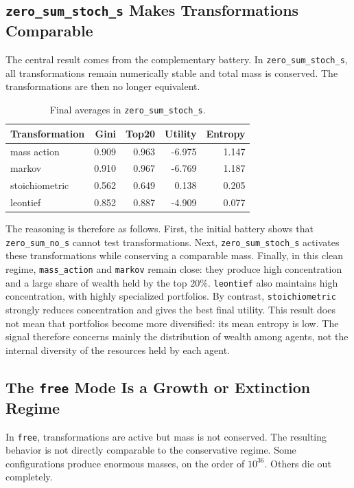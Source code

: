 \documentclass[11pt]{article}
\begin{document}
\subsection{\texttt{zero\_sum\_stoch\_s} Makes Transformations Comparable}

The central result comes from the complementary battery. In \texttt{zero\_sum\_stoch\_s}, all transformations remain numerically stable and total mass is conserved. The transformations are then no longer equivalent.

\begin{table}[H]
\centering
\begin{tabular}{lrrrr}
\toprule
Transformation & Gini & Top20 & Utility & Entropy \\
\midrule
mass action & 0.909 & 0.963 & -6.975 & 1.147 \\
markov & 0.910 & 0.967 & -6.769 & 1.187 \\
stoichiometric & 0.562 & 0.649 & 0.138 & 0.205 \\
leontief & 0.852 & 0.887 & -4.909 & 0.077 \\
\bottomrule
\end{tabular}
\caption{Final averages in \texttt{zero\_sum\_stoch\_s}.}
\end{table}

The reasoning is therefore as follows. First, the initial battery shows that \texttt{zero\_sum\_no\_s} cannot test transformations. Next, \texttt{zero\_sum\_stoch\_s} activates these transformations while conserving a comparable mass. Finally, in this clean regime, \texttt{mass\_action} and \texttt{markov} remain close: they produce high concentration and a large share of wealth held by the top $20\%$. \texttt{leontief} also maintains high concentration, with highly specialized portfolios. By contrast, \texttt{stoichiometric} strongly reduces concentration and gives the best final utility. This result does not mean that portfolios become more diversified: its mean entropy is low. The signal therefore concerns mainly the distribution of wealth among agents, not the internal diversity of the resources held by each agent.

\subsection{The \texttt{free} Mode Is a Growth or Extinction Regime}

In \texttt{free}, transformations are active but mass is not conserved. The resulting behavior is not directly comparable to the conservative regime. Some configurations produce enormous masses, on the order of $10^{36}$. Others die out completely.
\end{document}

